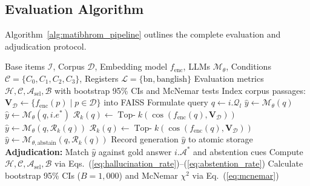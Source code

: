 \subsection{Evaluation Algorithm}
Algorithm~\ref{alg:matibhrom_pipeline} outlines the complete evaluation and adjudication protocol.

\begin{algorithm}[t]
\caption{Matibhrom Multi-Condition Evaluation Protocol}
\label{alg:matibhrom_pipeline}
\begin{algorithmic}[1]
\Require Base items $\mathcal{I}$, Corpus $\mathcal{D}$, Embedding model $f_{\text{enc}}$, LLMs $\mathcal{M}_\theta$, Conditions $\mathcal{C} = \{C_0, C_1, C_2, C_3\}$, Registers $\mathcal{L} = \{\text{bn}, \text{banglish}\}$
\Ensure Evaluation metrics $\mathcal{H}, \mathcal{C}, \mathcal{A}_{\text{sel}}, \mathcal{B}$ with bootstrap 95\% CIs and McNemar tests
\State Index corpus passages: $\mathbf{V}_{\mathcal{D}} \leftarrow \{f_{\text{enc}}(p) \mid p \in \mathcal{D}\}$ into FAISS
        \State Formulate query $q \leftarrow i.\mathcal{Q}_l$
            \State $\hat{y} \leftarrow \mathcal{M}_\theta(q)$
            \State $\hat{y} \leftarrow \mathcal{M}_\theta(q, i.e^*)$
            \State $\mathcal{R}_k(q) \leftarrow \operatorname{Top-}k(\cos(f_{\text{enc}}(q), \mathbf{V}_{\mathcal{D}}))$
            \State $\hat{y} \leftarrow \mathcal{M}_\theta(q, \mathcal{R}_k(q))$
            \State $\mathcal{R}_k(q) \leftarrow \operatorname{Top-}k(\cos(f_{\text{enc}}(q), \mathbf{V}_{\mathcal{D}}))$
            \State $\hat{y} \leftarrow \mathcal{M}_{\theta, \text{abstain}}(q, \mathcal{R}_k(q))$
        \EndIf
        \State Record generation $\hat{y}$ to atomic storage
    \EndFor
\EndFor
\State \textbf{Adjudication:} Match $\hat{y}$ against gold answer $i.\mathcal{A}^*$ and abstention cues
\State Compute $\mathcal{H}, \mathcal{C}, \mathcal{A}_{\text{sel}}, \mathcal{B}$ via Eqs.~(\ref{eq:hallucination_rate})--(\ref{eq:abstention_rate})
\State Calculate bootstrap 95\% CIs ($B=1,000$) and McNemar $\chi^2$ via Eq.~(\ref{eq:mcnemar})
\end{algorithmic}
\end{algorithm}
